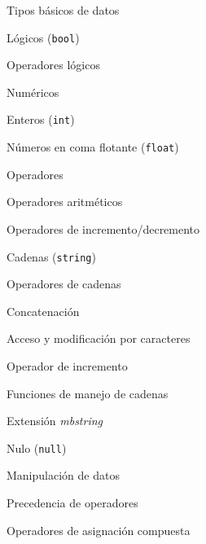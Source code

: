\begin{longenum}
\begin{longenum}
        \item Tipos básicos de datos
        \begin{longenum}
            \item Lógicos (\texttt{bool})
            \begin{longenum}
                \item Operadores lógicos
            \end{longenum}
            \item Numéricos
            \begin{longenum}
                \item Enteros (\texttt{int})
                \item Números en coma flotante (\texttt{float})
                \item Operadores
                \begin{longenum}
                    \item Operadores aritméticos
                    \item Operadores de incremento/decremento
                \end{longenum}
            \end{longenum}
            \item Cadenas (\texttt{string})
            \begin{longenum}
                \item Operadores de cadenas
                \begin{longenum}
                    \item Concatenación
                    \item Acceso y modificación por caracteres
                    \item Operador de incremento \opcional\
                \end{longenum}
                \item Funciones de manejo de cadenas
                \item Extensión \textit{mbstring}
            \end{longenum}
            \item Nulo (\texttt{null})
        \end{longenum}
        \item Manipulación de datos
        \begin{longenum}
            \item Precedencia de operadores
            \item Operadores de asignación compuesta

\end{longenum}
\end{longenum}
\end{longenum}
